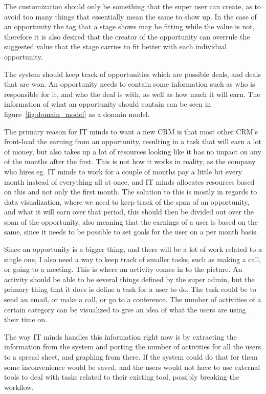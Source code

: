 The customization should only be something that the super user can create, as to avoid too many things that essentially mean the same to show up. In the case of an opportunity the tag that a stage shows may be fitting while the value is not, therefore it is also desired that the creator of the opportunity can overrule the suggested value that the stage carries to fit better with each individual opportunity.

The system should keep track of opportunities which are possible deals, and
deals that are won. An opportunity needs to contain some information such as who
is responsible for it, and who the deal is with, as well as how much it will
earn. The information of what an opportunity should contain can be seen in
figure~\ref{fig:domain_model} as a domain model.

The primary reason for IT minds to want a new CRM is that most other CRM's
front-load the earning from an opportunity, resulting in a task that will
earn a lot of money, but also takes up a lot of resources looking like it has no
impact on any of the months after the first. This is not how it works in
reality, as the company who hires eg. IT minds to work for a couple of months
pay a little bit every month instead of everything all at once, and IT minds
allocates resources based on this and not only the first month. The solution to
this is mostly in regards to data visualization, where we need to keep track of
the span of an opportunity, and what it will earn over that period, this should
then be divided out over the span of the opportunity, also meaning that the
earnings of a user is based on the same, since it needs to be possible to set
goals for the user on a per month basis. 

Since an opportunity is a bigger thing, and there will be a lot of work related
to a single one, I also need a way to keep track of smaller tasks, such as
making a call, or going to a meeting. This is where an activity comes in to the
picture. An activity should be able to be several things defined by the super
admin, but the primary thing that it does is define a task for a user to do. The
task could be to send an email, or make a call, or go to a conference. The
number of activities of a certain category can be visualized to give an idea of
what the users are using their time on. 

The way IT minds handles this information right now is by extracting the
information from the system and porting the number of activities for all the users
to a spread sheet, and graphing from there. If the system could do that for
them some inconvenience would be saved, and the users would not have to use
external tools to deal with tasks related to their existing tool, possibly
breaking the workflow.

